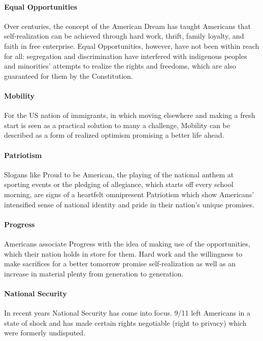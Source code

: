 \documentclass[10pt]{article}
\begin{document}
\paragraph{Equal Opportunities}\label{par:usa/values/eqop}
Over centuries, the concept of the American Dream has taught Americans that
self-realization can be achieved through hard work, thrift, family loyalty, and faith
in free enterprise. Equal Opportunities, however, have not been within reach for all: segregation and
discrimination have interfered with indigenous peoples and minorities' attempts
to realize the rights and freedoms, which are also guaranteed for them by the
Constitution.

\paragraph{Mobility}\label{par:usa/values/mob}
For the US nation of immigrants, in which moving elsewhere and making a fresh
start is seen as a practical solution to many a challenge, Mobility can be described as a
form of realized optimism promising a better life ahead.

\paragraph{Patriotism}\label{par:usa/values/pat}
Slogans like Proud to be American, the playing of the national anthem at sporting
events or the pledging of allegiance, which starts off every school morning, are
signs of a heartfelt omnipresent Patriotism which show Americans' intensified sense of
national identity and pride in their nation's unique promises.

\paragraph{Progress}\label{par:usa/values/prog}
Americans associate Progress with the idea of making use of the opportunities, which
their nation holds in store for them. Hard work and the willingness to make sacrifices
for a better tomorrow promise self-realization as well as an increase in
material plenty from generation to generation.

\paragraph{National Security}\label{par:usa/values/natsec}
In recent years National Security has come into focus. 9/11 left Americans in a state of shock
and has made certain rights negotiable (right to privacy) which were formerly
undisputed.
\end{document}
